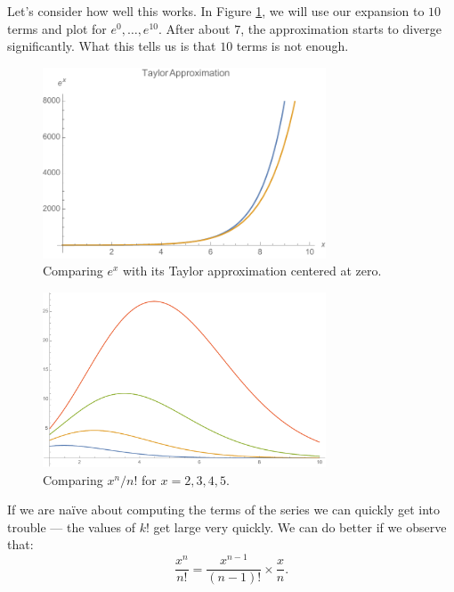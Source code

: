 \documentclass[11pt]{article}
\begin{document}
Let's consider how well this works. In Figure \ref{exp}, we will
use our expansion to $10$ terms and plot for $e^0 , \ldots  ,
e^{10}$. After about $7$, the approximation starts to diverge
significantly. What this tells us is that $10$ terms is not enough.

\begin{figure}[hbt]
\begin{centering}
\includegraphics[width=0.75\textwidth]{Exp}
\caption{Comparing $e^x$ with its Taylor approximation centered at zero.}\label{exp}
\end{centering}
\end{figure}



\begin{figure}[hbt]
\begin{centering}
\includegraphics[width=0.75\textwidth]{Growth}
\caption{Comparing ${x^n}/{n!}$ for $x=2,3,4,5$.}\label{growth}
\end{centering}
\end{figure}
If we are na\"ive about computing the terms of the series we can
quickly get into trouble --- the values of $k!$ get large very quickly.
We can do better if we observe that:
$$
\frac{x^n}{n!} = \frac{x^{n-1}}{(n-1)!} \times \frac{x}{n} .
$$
\end{document}
